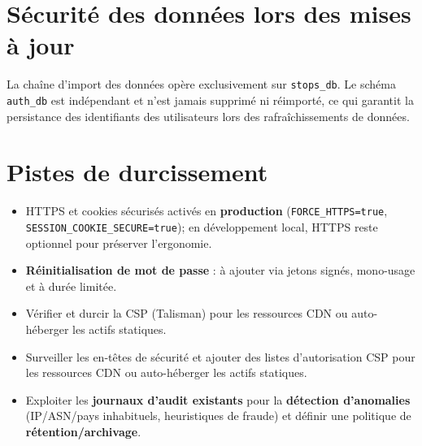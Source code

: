 \section{Sécurité des données lors des mises à jour}
La chaîne d'import des données opère exclusivement sur \texttt{stops\_db}. Le schéma \texttt{auth\_db} est indépendant et n'est jamais supprimé ni réimporté, ce qui garantit la persistance des identifiants des utilisateurs lors des rafraîchissements de données.

\section{Pistes de durcissement}
\begin{itemize}
  \item HTTPS et cookies sécurisés activés en \textbf{production} (\texttt{FORCE\_HTTPS=true}, \texttt{SESSION\_COOKIE\_SECURE=true}); en développement local, HTTPS reste optionnel pour préserver l'ergonomie.
  \item \textbf{Réinitialisation de mot de passe} : à ajouter via jetons signés, mono-usage et à durée limitée.
  \item Vérifier et durcir la CSP (Talisman) pour les ressources CDN ou auto-héberger les actifs statiques.
  \item Surveiller les en-têtes de sécurité et ajouter des listes d'autorisation CSP pour les ressources CDN ou auto-héberger les actifs statiques.
  \item Exploiter les \textbf{journaux d'audit existants} pour la \textbf{détection d'anomalies} (IP/ASN/pays inhabituels, heuristiques de fraude) et définir une politique de \textbf{rétention/archivage}.
\end{itemize}


